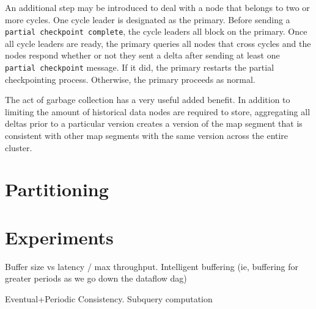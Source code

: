 \documentclass{vldb}
\begin{document}
An additional step may be introduced to deal with a node that belongs to two or more cycles.  One cycle leader is designated as the primary.  Before sending a \texttt{partial checkpoint complete}, the cycle leaders all block on the primary.  Once all cycle leaders are ready, the primary queries all nodes that cross cycles and the nodes respond whether or not they sent a delta after sending at least one \texttt{partial checkpoint} message.  If it did, the primary restarts the partial checkpointing process.  Otherwise, the primary proceeds as normal.

The act of garbage collection has a very useful added benefit.  In addition to limiting the amount of historical data nodes are required to store, aggregating all deltas prior to a particular version creates a version of the map segment that is consistent with other map segments with the same version across the entire cluster.

\section{Partitioning}
\label{sec:partitioning}

\section{Experiments}

Buffer size vs latency / max throughput.  Intelligent buffering (ie, buffering for greater periods as we go down the dataflow dag)


Eventual+Periodic Consistency.
Subquery computation

{\small


}
\end{document}
